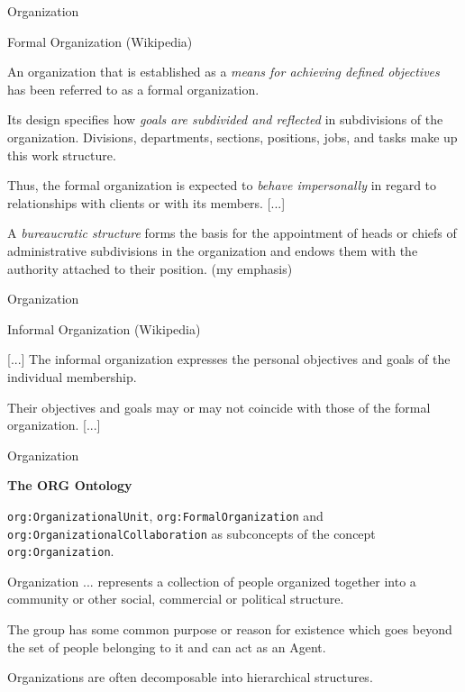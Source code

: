 \documentclass{beamer}
\newcommand{\ueberschrift}[1]{\begin{center}\bf #1\end{center}}
\begin{document}
\begin{frame}{Organization}

  \begin{block}{Formal Organization (Wikipedia)}
    
    An organization that is established as a \emph{means for achieving defined
      objectives} has been referred to as a formal organization.\medskip

    Its design specifies how \emph{goals are subdivided and reflected} in
    subdivisions of the organization. Divisions, departments, sections,
    positions, jobs, and tasks make up this work structure.\medskip

    Thus, the formal organization is expected to \emph{behave impersonally} in
    regard to relationships with clients or with its members. [...]\medskip

    A \emph{bureaucratic structure} forms the basis for the appointment of
    heads or chiefs of administrative subdivisions in the organization and
    endows them with the authority attached to their position.  (my emphasis)
  \end{block}
\end{frame}


\begin{frame}{Organization}
  \begin{block}{Informal Organization (Wikipedia)}
   
    [...] The informal organization expresses the personal objectives and
    goals of the individual membership.

    Their objectives and goals may or may not coincide with those of the
    formal organization. [...]
  \end{block}
\end{frame}

\begin{frame}{Organization}

  \ueberschrift{The ORG Ontology}

  \texttt{org:OrganizationalUnit}, \texttt{org:FormalOrganization} and
  \texttt{org:OrganizationalCollaboration} as subconcepts of the concept
  \texttt{org:Organization}.

  \begin{block}{Organization}
    ... represents a collection of people organized together into a community
    or other social, commercial or political structure.\medskip

    The group has some common purpose or reason for existence which goes
    beyond the set of people belonging to it and can act as an Agent.\medskip

    Organizations are often decomposable into hierarchical structures.
  \end{block}
\end{frame}
\end{document}
